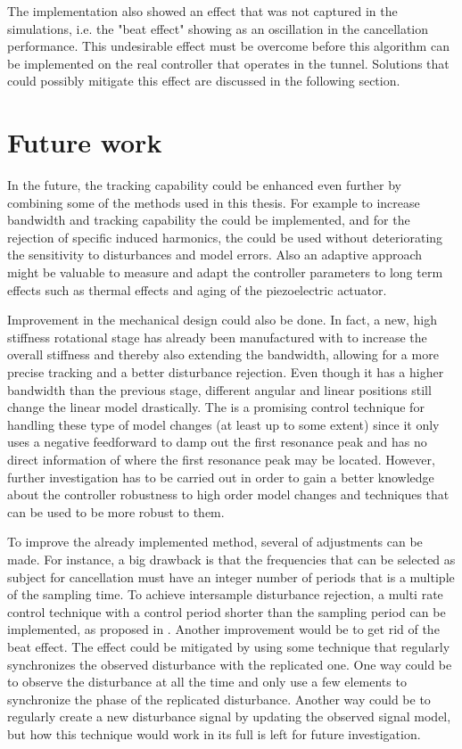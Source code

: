The implementation also showed an effect that was not captured in the simulations, i.e. the "beat effect" showing as an oscillation in the cancellation performance. This undesirable effect must be overcome before this algorithm can be implemented on the real controller that operates in the \abbrLHC tunnel. Solutions that could possibly mitigate this effect are discussed in the following section.

\section{Future work}
In the future, the tracking capability could be enhanced even further by combining some of the methods used in this thesis. For example to increase bandwidth and tracking capability the \abbrIRC could be implemented, and for the rejection of specific induced harmonics, the \abbrRFDC could be used without deteriorating the sensitivity to disturbances and model errors. Also an adaptive approach might be valuable to measure and adapt the controller parameters to long term effects such as thermal effects and aging of the piezoelectric actuator.

Improvement in the mechanical design could also be done. In fact, a new, high stiffness rotational stage has already been manufactured with to increase the overall stiffness and thereby also extending the bandwidth, allowing for a more precise tracking and a better disturbance rejection. Even though it has a higher bandwidth than the previous stage, different angular and linear positions still change the linear model drastically. The \abbrIRC is a promising control technique for handling these type of model changes (at least up to some extent) since it only uses a negative feedforward to damp out the first resonance peak and has no direct information of where the first resonance peak may be located. However, further investigation has to be carried out in order to gain a better knowledge about the controller robustness to high order model changes and techniques that can be used to be more robust to them.

To improve the already implemented \abbrRFDC method, several of adjustments can be made. For instance, a big drawback is that the frequencies that can be selected as subject for cancellation must have an integer number of periods that is a multiple of the sampling time. To achieve intersample disturbance rejection, a multi rate control technique with a control period shorter than the sampling period can be implemented, as proposed in \citep{fujimoto2009rro}. Another improvement would be to get rid of the beat effect. The effect could be mitigated by using some technique that regularly synchronizes the observed disturbance with the replicated one. One way could be to observe the disturbance at all the time and only use a few elements to synchronize the phase of the replicated disturbance. Another way could be to regularly create a new disturbance signal by updating the observed signal model, but how this technique would work in its full is left for future investigation.
